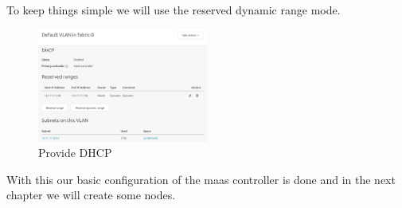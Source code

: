 To keep things simple we will use the reserved dynamic range mode.

\begin{figure}[!ht]
    \centering
    \includegraphics[width=0.5\textwidth]{images/4-9.png}
    \caption{Provide DHCP}
\end{figure}

With this our basic configuration of the maas controller is done and in the next chapter we will create some nodes.
